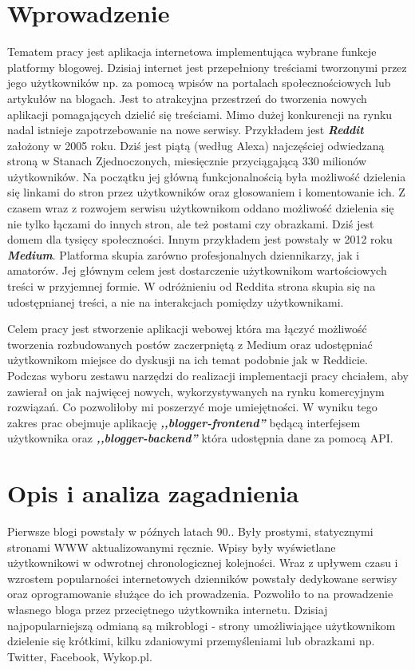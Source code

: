 \documentclass[declaration,shortabstract]{iithesis}
\author         {Oskar Sobczyk}
\date          {}                     %
\begin{document}

\chapter{Wprowadzenie}
Tematem pracy jest aplikacja internetowa implementująca wybrane funkcje platformy blogowej. Dzisiaj internet jest przepełniony treściami tworzonymi przez jego użytkowników np. za pomocą wpisów na portalach społecznościowych lub artykułów na blogach. Jest to atrakcyjna przestrzeń do tworzenia nowych aplikacji pomagających dzielić się treściami. Mimo dużej konkurencji na rynku nadal istnieje zapotrzebowanie na nowe serwisy. Przykładem jest  \textit{\textbf{Reddit}} założony w 2005 roku. Dziś jest piątą (według Alexa) najczęściej odwiedzaną stroną w Stanach Zjednoczonych, miesięcznie przyciągającą 330 milionów użytkowników. Na początku jej główną funkcjonalnością była możliwość dzielenia się linkami do stron przez użytkowników oraz głosowaniem i komentowanie ich. Z czasem wraz z rozwojem serwisu użytkownikom oddano możliwość dzielenia się nie tylko łączami do innych stron, ale też postami czy obrazkami. Dziś jest domem dla tysięcy społeczności. Innym przykładem jest powstały w 2012 roku \textit{\textbf{Medium}}. Platforma skupia zarówno profesjonalnych dziennikarzy, jak i amatorów. Jej głównym celem jest dostarczenie użytkownikom wartościowych treści w przyjemnej formie. W odróżnieniu od Reddita strona skupia się na udostępnianej treści, a nie na interakcjach pomiędzy użytkownikami. 

Celem pracy jest stworzenie aplikacji webowej która ma łączyć możliwość tworzenia rozbudowanych postów zaczerpniętą z Medium oraz udostępniać użytkownikom miejsce do dyskusji na ich temat podobnie jak w Reddicie. Podczas wyboru zestawu narzędzi do realizacji implementacji pracy chciałem, aby zawierał on jak najwięcej nowych, wykorzystywanych na rynku komercyjnym rozwiązań. Co pozwoliłoby mi poszerzyć moje umiejętności. W wyniku tego zakres prac obejmuje aplikację \textbf{\textit{,,blogger-frontend''}} będącą interfejsem użytkownika oraz \textbf{\textit{,,blogger-backend''}} która udostępnia dane za pomocą API.

\chapter{Opis i analiza zagadnienia}

Pierwsze blogi powstały w późnych latach 90.. Były prostymi, statycznymi stronami WWW aktualizowanymi ręcznie. Wpisy były wyświetlane użytkownikowi w odwrotnej chronologicznej kolejności. Wraz z upływem czasu i wzrostem popularności internetowych dzienników powstały dedykowane serwisy oraz oprogramowanie służące do ich prowadzenia. Pozwoliło to na prowadzenie własnego bloga przez przeciętnego użytkownika internetu. Dzisiaj najpopularniejszą odmianą są mikroblogi - strony umożliwiające użytkownikom dzielenie się krótkimi, kilku zdaniowymi przemyśleniami lub obrazkami np. Twitter, Facebook, Wykop.pl.
\end{document}
